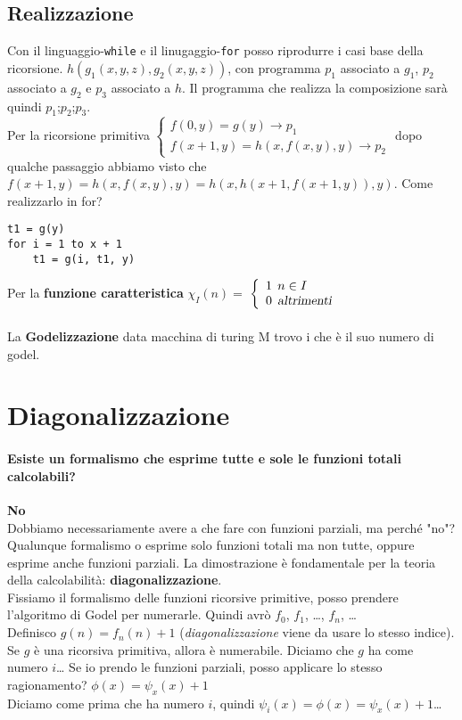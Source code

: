 \documentclass[10pt]{book}
\begin{document}
\subsection{Realizzazione}
Con il linguaggio-\texttt{while} e il linugaggio-\texttt{for} posso riprodurre i casi base della ricorsione.
$h(g_1(x, y, z), g_2(x, y, z))$, con programma $p_1$ associato a $g_1$, $p_2$ associato a $g_2$ e $p_3$ associato a $h$. Il programma che realizza la composizione sarà quindi $p_1$;$p_2$;$p_3$.\\Per la ricorsione primitiva
\begin{math}
		\left\{
		\begin{array}{l}
			f(0, y) = g(y) \rightarrow p_1\\
			f(x + 1, y) = h(x, f(x, y), y) \rightarrow p_2
		\end{array}
		\right.
\end{math}
dopo qualche passaggio abbiamo visto che\\$f(x + 1, y) =  h(x, f(x, y), y) = h(x, h(x + 1, f( x + 1, y)), y)$. Come realizzarlo in for?
\begin{verbatim}
t1 = g(y)
for i = 1 to x + 1
	t1 = g(i, t1, y)
\end{verbatim}
Per la \textbf{funzione caratteristica} $\chi_I(n) =$
\begin{math}
		\left\{
		\begin{array}{l}
			1\:\: n \in I\\
			0\:\:\textsl{altrimenti}
		\end{array}
		\right.
\end{math}\\\\
La \textbf{Godelizzazione} data macchina di turing M trovo i che è il suo numero di godel.
\section{Diagonalizzazione}
\paragraph{Esiste un formalismo che esprime tutte e sole le funzioni totali calcolabili?} \textbf{No}\\
Dobbiamo necessariamente avere a che fare con funzioni parziali, ma perché "no"? Qualunque formalismo o esprime solo funzioni totali ma non tutte, oppure esprime anche funzioni parziali. La dimostrazione è fondamentale per la teoria della calcolabilità: \textbf{diagonalizzazione}.\\
Fissiamo il formalismo delle funzioni ricorsive primitive, posso prendere l'algoritmo di Godel per numerarle. Quindi avrò $f_0$, $f_1$, \ldots, $f_n$, \ldots\\
Definisco $g(n) = f_n(n) + 1$ (\textit{diagonalizzazione} viene da usare lo stesso indice).\\
Se $g$ è una ricorsiva primitiva, allora è numerabile. Diciamo che $g$ ha come numero $i$\ldots %
Se io prendo le funzioni parziali, posso applicare lo stesso ragionamento? $\phi(x) = \psi_x(x) + 1$\\
Diciamo come prima che ha numero $i$, quindi $\psi_i(x) = \phi(x) = \psi_x(x) + 1$\ldots\\
\pagebreak
\end{document}
